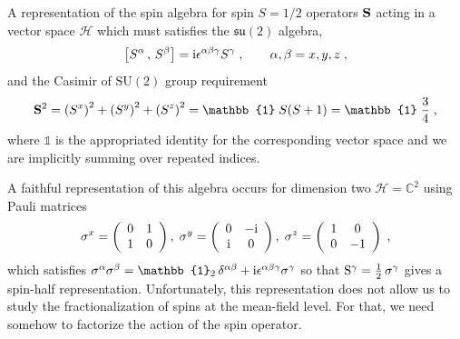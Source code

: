 


A representation of the spin algebra for spin $S=1/2$ operators $\mathbf{S}$ acting in a vector space $\mathcal{H}$ which must satisfies the $\mathfrak{su}(2)$ algebra,
\begin{equation}
    \big[ S^\alpha \, , \, S^\beta \big] =  \im %
    \epsilon^{\alpha\beta\gamma} S^\gamma \; , \qquad \alpha, \beta  =x,y, z\; ,
\end{equation}
and the Casimir of $\mathrm{SU}(2)$ group requirement
\begin{equation}
    \mb{S}^2 = \left( S^x \right)^2+\left( S^y \right)^2+\left( S^z \right)^2= \mathbb{1}\; S(S+1) = \mathbb{1}\; \frac{3}{4} \;  ,  \label{eq:casimir}
\end{equation}
where $\mathbb{1}$ is the appropriated identity for the corresponding vector space and we are implicitly summing over repeated indices.

A faithful representation of this algebra occurs for dimension two $\mathcal{H}=\mathbb{C}^2$ using Pauli matrices
 \begin{equation}
     \sigma^x = \left(\begin{array}{cc}0&1\\ 1& 0   \end{array}\right), \;
     \sigma^y = \left(\begin{array}{cc}0&-\mathrm{i} \\ \mathrm{i} & 0   \end{array}\right), \;
     \sigma^z = \left(\begin{array}{cc}1&0 \\ 0 & -1 \end{array}\right)\;,
 \end{equation}
 which satisfies $\sigma^\alpha \sigma^ \beta = \mathbb{1}_2 \, \delta^ {\alpha\beta} + \im \epsilon^{\alpha\beta\gamma} \sigma^ \gamma$ so that $\mathrm{S}^\gamma=\frac{1}{2} \, \sigma^\gamma$ gives a spin-half representation.
 Unfortunately, this representation does not allow us to study the fractionalization of spins at the mean-field level. For that, we need somehow to factorize the action of the spin operator.

